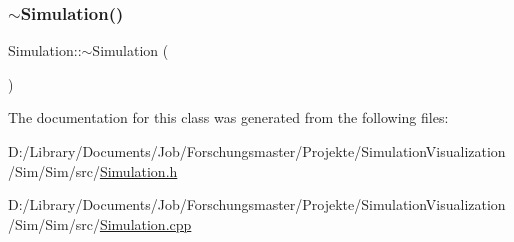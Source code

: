 \mbox{\label{class_simulation_a80fad3f57dfaf195a36f7bc49bc88279}} 
\subsubsection{\texorpdfstring{$\sim$\+Simulation()}{~Simulation()}}
{\footnotesize\ttfamily Simulation\+::$\sim$\+Simulation (\begin{DoxyParamCaption}{ }\end{DoxyParamCaption})}



The documentation for this class was generated from the following files\+:\begin{DoxyCompactItemize}
\item 
D\+:/\+Library/\+Documents/\+Job/\+Forschungsmaster/\+Projekte/\+Simulation\+Visualization/\+Sim/\+Sim/src/\mbox{\hyperlink{_simulation_8h}{Simulation.\+h}}\item 
D\+:/\+Library/\+Documents/\+Job/\+Forschungsmaster/\+Projekte/\+Simulation\+Visualization/\+Sim/\+Sim/src/\mbox{\hyperlink{_simulation_8cpp}{Simulation.\+cpp}}\end{DoxyCompactItemize}
